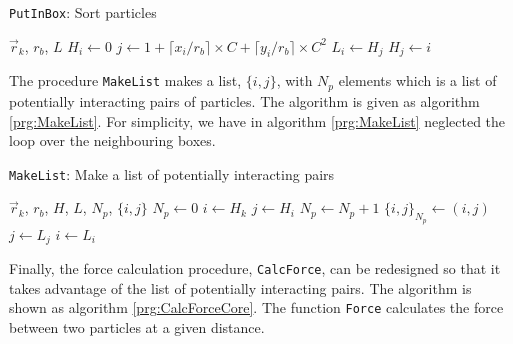 \begin{algorithm}
  \caption[\texttt{PutInBox}: Sort Particles]{\texttt{PutInBox}: Sort particles}
  \label{prg:PutInBox}
  \begin{algorithmic}
    \REQUIRE $\vec{r}_k$, $r_b$, $L$
      \STATE $H_i \leftarrow 0$ 
    \ENDFOR
      \STATE $j \leftarrow 1+\lceil{x_i/r_b}\rceil\times
             C+\lceil{y_i/r_b}\rceil\times C^2$
      \STATE $L_i \leftarrow H_j$ 
      \STATE $H_j \leftarrow i$
    \ENDFOR
  \end{algorithmic}
\end{algorithm}

The procedure \texttt{MakeList} makes a list, $\{i, j\}$, with $N_p$
elements which is a list of potentially interacting pairs of
particles. The algorithm is given as algorithm \ref{prg:MakeList}. For
simplicity, we have in algorithm \ref{prg:MakeList} neglected the loop
over the neighbouring boxes.

\begin{algorithm}
  \caption[\texttt{MakeList}: Make a list]{\texttt{MakeList}: Make a list of potentially interacting
    pairs} 
  \label{prg:MakeList}
  \begin{algorithmic}
    \REQUIRE $\vec{r}_k$, $r_b$, $H$, $L$, $N_p$, $\{i, j\}$
    \STATE $N_p \leftarrow 0$ 
      \STATE $i \leftarrow H_k$
        \STATE $j \leftarrow H_i$
            \STATE $N_p \leftarrow N_p+1$ 
            \STATE $\{i, j\}_{N_p} \leftarrow (i, j)$
          \ENDIF
          \STATE $j \leftarrow L_j$
        \ENDWHILE
      \ENDWHILE
      \STATE $i \leftarrow L_i$
    \ENDFOR
  \end{algorithmic}
\end{algorithm}

Finally, the force calculation procedure, \texttt{CalcForce}, can be
redesigned so that it takes advantage of the list of potentially interacting
pairs. The algorithm is shown as algorithm
\ref{prg:CalcForceCore}. The function \texttt{Force} calculates the
force between two particles at a given distance.

